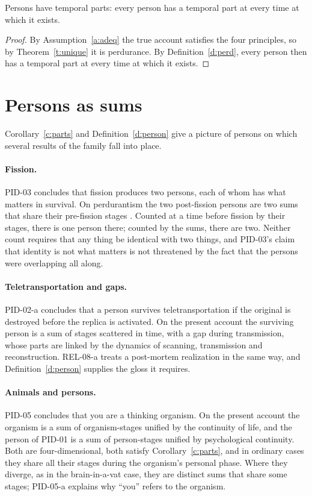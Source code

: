 \documentclass{situationist-preprint}
\begin{document}
\begin{corollary}\label{c:parts}
Persons have temporal parts: every person has a temporal part at every time at which it exists.
\end{corollary}

\begin{proof}
By Assumption~\ref{a:adeq} the true account satisfies the four principles, so by Theorem~\ref{t:unique} it is perdurance. By Definition~\ref{d:perd}, every person then has a temporal part at every time at which it exists.
\end{proof}

\section{Persons as sums}\label{s:sums}

Corollary~\ref{c:parts} and Definition~\ref{d:person} give a picture of persons on which several results of the family fall into place.

\paragraph{Fission.} PID-03 concludes that fission produces two persons, each of whom has what matters in survival. On perdurantism the two post-fission persons are two sums that share their pre-fission stages \citep{Lewis1976}. Counted at a time before fission by their stages, there is one person there; counted by the sums, there are two. Neither count requires that any thing be identical with two things, and PID-03's claim that identity is not what matters is not threatened by the fact that the persons were overlapping all along.

\paragraph{Teletransportation and gaps.} PID-02-a concludes that a person survives teletransportation if the original is destroyed before the replica is activated. On the present account the surviving person is a sum of stages scattered in time, with a gap during transmission, whose parts are linked by the dynamics of scanning, transmission and reconstruction. REL-08-a treats a post-mortem realization in the same way, and Definition~\ref{d:person} supplies the gloss it requires.

\paragraph{Animals and persons.} PID-05 concludes that you are a thinking organism. On the present account the organism is a sum of organism-stages unified by the continuity of life, and the person of PID-01 is a sum of person-stages unified by psychological continuity. Both are four-dimensional, both satisfy Corollary~\ref{c:parts}, and in ordinary cases they share all their stages during the organism's personal phase. Where they diverge, as in the brain-in-a-vat case, they are distinct sums that share some stages; PID-05-a explains why \enquote{you} refers to the organism.
\end{document}
